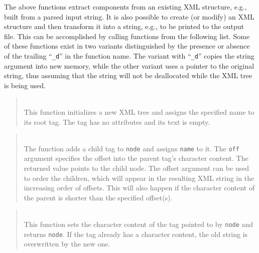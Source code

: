 The above functions extract components from an existing XML structure, e.g., 
built from a parsed input string.
It is also possible to create (or modify) an XML structure and then transform
it into a string, e.g., to be printed to the output file.
This can be accomplished by calling functions from the following list.
Some of these functions exist in two variants distinguished by the presence
or absence of the trailing ``{\tt \_d}'' in the function name.
The variant with ``{\tt \_d}'' copies the string argument into new memory, while
the other variant uses a pointer to the original string, thus assuming that
the string will not be deallocated while the XML tree is being used.

\begin{quote}
\noindent\hspace{-0.35in}{\tt sxml\_t sxml\_new[\_d] (const char *name); }\\ \hspace{0in}
This function initializes a new XML tree and assigns the specified name to
its root tag.
The tag has no attributes and its text is empty.
\end{quote}

\begin{quote}
\noindent\hspace{-0.35in}{\tt sxml\_t sxml\_add\_child[\_d] (sxml\_t node, const char *name, size\_t off); }\\ \hspace{0in}
The function adds a child tag to {\tt node} and assigns {\tt name} to it.
The {\tt off} argument specifies the offset into the parent tag's 
character content.
The returned value points to the child node.
The offset argument can be used to order the children, which will appear in the
resulting XML string in the increasing order of offsets.
This will also happen if the character content of the parent is shorter than
the specified offset(s).
\end{quote}

\begin{quote}
\noindent\hspace{-0.35in}{\tt sxml\_t sxml\_set\_txt[\_d] (sxml\_t node, const char *txt); }\\ \hspace{0in}
This function sets the character content of the tag pointed to by {\tt node}
and returns {\tt node}.
If the tag already has a character content, the old string is overwritten by the
new one.
\end{quote}

